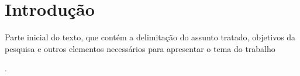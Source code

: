 
\chapter[Introdução]{Introdução}
\label{Introdução}

Parte inicial do texto, que contém a delimitação do assunto tratado, objetivos da pesquisa e outros elementos necessários para apresentar o tema do trabalho \cite{sibi2016} 

.



	
